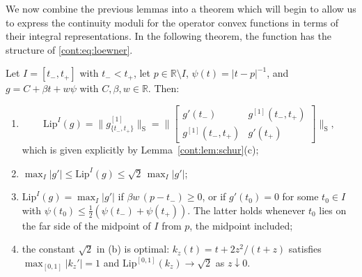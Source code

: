 We now combine the previous lemmas into a theorem which will begin to allow us to express the continuity moduli for the operator convex functions in terms of their integral representations. In the following theorem, the function has the structure of \eqref{cont:eq:loewner}.
 
\begin{theorem}\label{cont:thm:one pole}
Let $I=[t_-,t_+]$ with $t_-<t_+$, let $p\in\mathbb{R}\setminus I$, $\psi(t)=|t-p|^{-1}$, and $g=C+\beta t+w\psi$ with $C,\beta,w\in\mathbb{R}$. Then:
\begin{enumerate}
\item[(a)] \[\mathrm{Lip}^I(g)=\big\|g^{[1]}_{\{t_-,t_+\}}\big\|_{\mathrm S}=\Big\|\begin{bmatrix}g'(t_-)&g^{[1]}(t_-,t_+)\\g^{[1]}(t_-,t_+)&g'(t_+)\end{bmatrix}\Big\|_{\mathrm S},\] which is given explicitly by Lemma~\ref{cont:lem:schur}(c);
\item[(b)] $\max_I|g'|\leq\mathrm{Lip}^I(g)\leq\sqrt2\,\max_I|g'|$;
\item[(c)] $\mathrm{Lip}^I(g)=\max_I|g'|$ if $\beta w\,(p-t_-)\geq0$, or if $g'(t_0)=0$ for some $t_0\in I$ with $\psi(t_0)\leq\frac12(\psi(t_-)+\psi(t_+))$. The latter holds whenever $t_0$ lies on the far side of the midpoint of $I$ from $p$, the midpoint included;
\item[(d)] the constant $\sqrt2$ in (b) is optimal: $k_z(t)=t+2z^2/(t+z)$ satisfies $\max_{[0,1]}|k_z'|=1$ and $\mathrm{Lip}^{[0,1]}(k_z)\to\sqrt2$ as $z\downarrow0$.
\end{enumerate}
\end{theorem}
 
